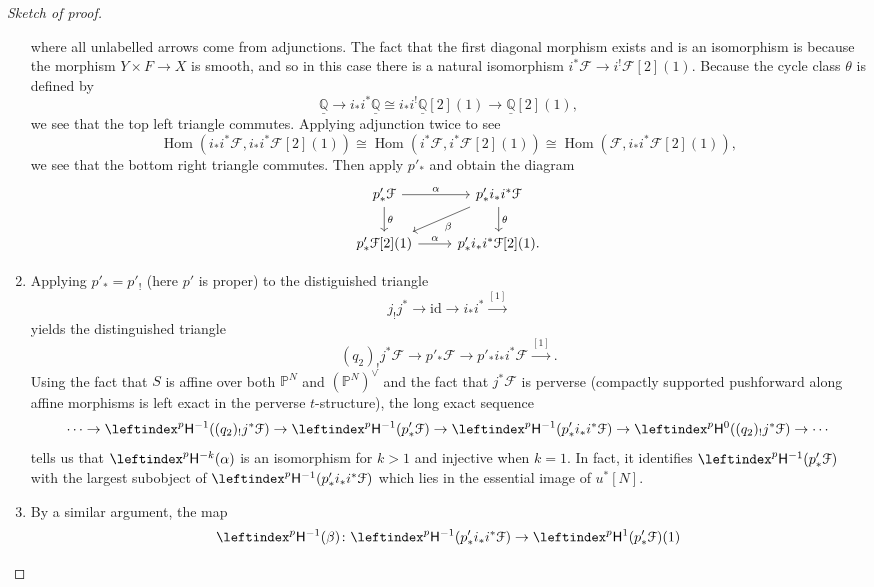 \documentclass{amsart}
\theoremstyle{definition}
\theoremstyle{remark}
\theoremstyle{plain}
\theoremstyle{definition}
\theoremstyle{remark}
\newcommand{\Q}{\mathbb{Q}}
\renewcommand{\P}{\mathbb{P}}
\newcommand{\sH}{\mathsf{H}}
\newcommand{\mc}[1]{\mathcal{#1}}
\newcommand{\mr}[1]{\mathrm{#1}}
\newcommand{\ul}[1]{\underline{#1}}
\newcommand{\1}{\mathbf{1}}
\newcommand{\2}{\mathbf{2}}
\newcommand{\3}{\mathbf{3}}
\DeclareMathOperator{\Hom}{Hom}
\begin{document}
\begin{proof}[Sketch of proof]
\begin{enumerate}
\begin{equation*}
            \end{equation*}
            where all unlabelled arrows come from adjunctions. The fact that the first diagonal morphism exists and is an isomorphism is because the morphism $Y \times F \to X$ is smooth, and so in this case there is a natural isomorphism
            $i^* \mc{F} \to i^! \mc{F}[2](1)$. Because the cycle class $\theta$ is defined by
            \[ \ul{\Q} \to i_* i^*\ul{\Q} \cong i_* i^! \ul{\Q}[2](1) \to \ul{\Q}[2](1), \]
            we see that the top left triangle commutes. Applying adjunction twice to see
            \[ \Hom(i_* i^* \mc{F}, i_* i^* \mc{F}[2](1)) \cong \Hom(i^* \mc{F}, i^* \mc{F}[2](1)) \cong \Hom(\mc{F}, i_* i^* \mc{F}[2](1)), \]
            we see that the bottom right triangle commutes. Then apply $p'_*$ and obtain the diagram
            \begin{equation*}
            \begin{tikzcd}
                p'_* \mc{F} \ar{r}{\alpha} \ar{d}{\theta} & p'_* i_* i^* \mc{F} \ar{d}{\theta} \ar{dl}{\beta} \\
                p'_* \mc{F}[2](1) \ar{r}{\alpha} & p'_* i_* i^* \mc{F}[2](1).
            \end{tikzcd}
            \end{equation*}
        \item Applying $p'_* = p'_!$ (here $p'$ is proper) to the distiguished triangle
            \[ j_! j^* \to \mr{id} \to i_* i^* \xrightarrow{[1]} \]
            yields the distinguished triangle
            \[ (q_2)_! j^* \mc{F} \to p'_* \mc{F} \to p'_* i_* i^* \mc{F} \xrightarrow{[1]}. \]
            Using the fact that $S$ is affine over both $\P^N$ and $(\P^N)^{\vee}$ and the fact that $j^* \mc{F}$ is perverse (compactly supported pushforward along affine morphisms is left exact in the perverse $t$-structure), the long exact sequence
            \[ \cdots \to \leftindex^p \sH^{-1}((q_2)_! j^* \mc{F}) \to \leftindex^p \sH^{-1}(p'_* \mc{F}) \to \leftindex^p \sH^{-1} (p'_*i_* i^* \mc{F}) \to \leftindex^p \sH^{0}((q_2)_! j^* \mc{F}) \to \cdots \]
            tells us that $\leftindex^p \sH^{-k}(\alpha)$ is an isomorphism for $k > 1$ and injective when $k = 1$. In fact, it identifies $\leftindex^p \sH^{-1}(p'_* \mc{F})$ with the largest subobject of $\leftindex^p \sH^{-1}(p'_* i_* i^* \mc{F})$ which lies in the essential image of $u^*[N]$.
        \item By a similar argument, the map
            \[ \leftindex^p \sH^{-1}(\beta) \colon \leftindex^p \sH^{-1}(p'_* i_* i^* \mc{F}) \to \leftindex^p \sH^1(p'_* \mc{F})(1) \]

\end{enumerate}
\end{proof}
\end{document}
